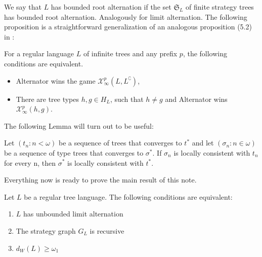 We say that $L$ has bounded root alternation if the set $\mathfrak{S}_L$ of finite strategy trees has bounded root alternation. Analogously for limit alternation.
The following proposition is a straightforward generalization of an analogous proposition (5.2) in \cite{bp}:
\begin{proposition}\label{prop:tree_to_types}
 For a regular language $L$ of infinite trees and any prefix $p$, the following conditions are equivalent.
 \begin{itemize}
\item Alternator wins the game $\mathcal{X}^p_\infty(L, L^\complement)$, 
 \item  There are tree types $h, g\in H_L$, such that $h\neq g$ and Alternator wins $\mathcal{X}^p_\infty(h, g)$.
 \end{itemize}
\end{proposition}
The following Lemma will turn out to be useful:
\begin{lemma}\label{lemma:limit}
Let $(t_n: n <\omega)$ be a sequence of trees that converges to $t^*$ and let $(\sigma_n: n \in \omega)$ be a sequence of type trees that converges to $\sigma^*$. If $\sigma_n$ is locally consistent with $t_n$ for every n, then $\sigma^*$ is locally consistent with $t^*$.
\end{lemma}
Everything now is ready to prove the main result of this note.
\begin{theorem}
Let $L$ be a regular tree language. The following conditions are equivalent:
\begin{enumerate}
\item $L$ has unbounded limit alternation
\item The strategy graph $G_L$ is recursive
\item $d_W(L) \geq \omega_1$
\end{enumerate}
\end{theorem}

